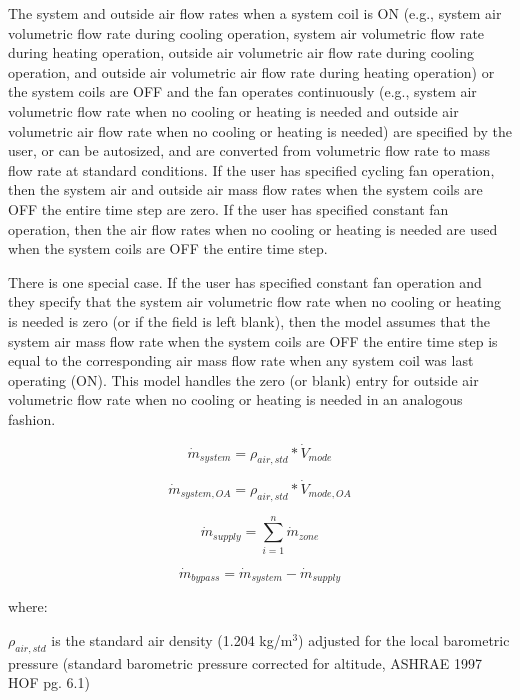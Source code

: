 The system and outside air flow rates when a system coil is ON (e.g., system air volumetric flow rate during cooling operation, system air volumetric flow rate during heating operation, outside air volumetric air flow rate during cooling operation, and outside air volumetric air flow rate during heating operation) or the system coils are OFF and the fan operates continuously (e.g., system air volumetric flow rate when no cooling or heating is needed and outside air volumetric air flow rate when no cooling or heating is needed) are specified by the user, or can be autosized, and are converted from volumetric flow rate to mass flow rate at standard conditions. If the user has specified cycling fan operation, then the system air and outside air mass flow rates when the system coils are OFF the entire time step are zero. If the user has specified constant fan operation, then the air flow rates when no cooling or heating is needed are used when the system coils are OFF the entire time step.

There is one special case. If the user has specified constant fan operation and they specify that the system air volumetric flow rate when no cooling or heating is needed is zero (or if the field is left blank), then the model assumes that the system air mass flow rate when the system coils are OFF the entire time step is equal to the corresponding air mass flow rate when any system coil was last operating (ON). This model handles the zero (or blank) entry for outside air volumetric flow rate when no cooling or heating is needed in an analogous fashion.

\begin{equation}
{\dot m_{system}} = {\rho_{air,std}}*{\dot V_{mode}}
\end{equation}

\begin{equation}
{\dot m_{system,OA}} = {\rho_{air,std}}*{\dot V_{mode,OA}}
\end{equation}

\begin{equation}
{\dot m_{supply}} = \sum\limits_{i = 1}^n {{{\dot m}_{zone}}}
\end{equation}

\begin{equation}
{\dot m_{bypass}} = {\dot m_{system}} - {\dot m_{supply}}
\end{equation}

where:

\({\rho_{air,std}}\) is the standard air density (1.204 kg/m\(^{3}\)) adjusted for the local barometric pressure (standard barometric pressure corrected for altitude, ASHRAE 1997 HOF pg. 6.1)

